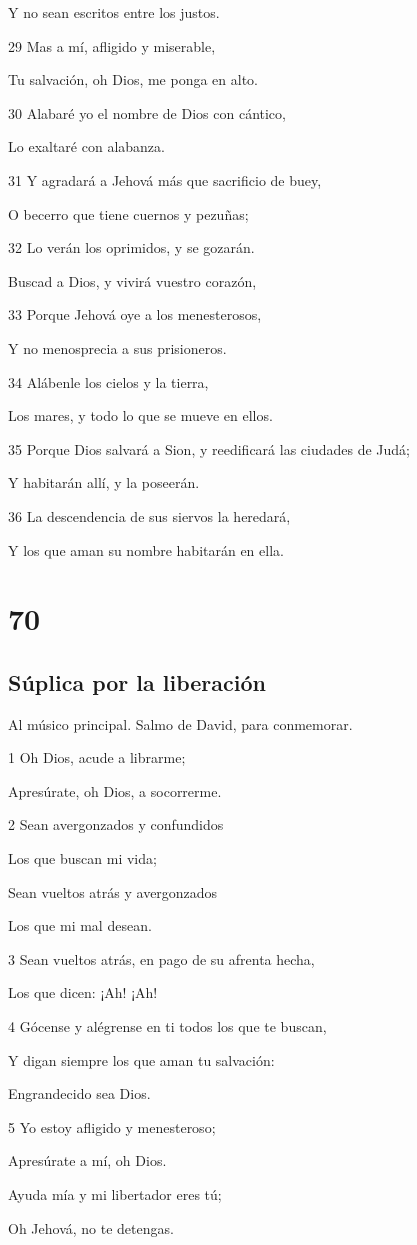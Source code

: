 \par Y no sean escritos entre los justos.
\par 29 Mas a mí, afligido y miserable,
\par Tu salvación, oh Dios, me ponga en alto.
\par 30 Alabaré yo el nombre de Dios con cántico,
\par Lo exaltaré con alabanza.
\par 31 Y agradará a Jehová más que sacrificio de buey,
\par O becerro que tiene cuernos y pezuñas;
\par 32 Lo verán los oprimidos, y se gozarán.
\par Buscad a Dios, y vivirá vuestro corazón,
\par 33 Porque Jehová oye a los menesterosos,
\par Y no menosprecia a sus prisioneros.
\par 34 Alábenle los cielos y la tierra,
\par Los mares, y todo lo que se mueve en ellos.
\par 35 Porque Dios salvará a Sion, y reedificará las ciudades de Judá;
\par Y habitarán allí, y la poseerán.
\par 36 La descendencia de sus siervos la heredará,
\par Y los que aman su nombre habitarán en ella.

\chapter{70}

\section*{Súplica por la liberación}

\par Al músico principal. Salmo de David, para conmemorar.

\par 1 Oh Dios, acude a librarme;
\par Apresúrate, oh Dios, a socorrerme.
\par 2 Sean avergonzados y confundidos
\par Los que buscan mi vida;
\par Sean vueltos atrás y avergonzados
\par Los que mi mal desean.
\par 3 Sean vueltos atrás, en pago de su afrenta hecha,
\par Los que dicen: ¡Ah! ¡Ah!
\par 4 Gócense y alégrense en ti todos los que te buscan,
\par Y digan siempre los que aman tu salvación:
\par Engrandecido sea Dios.
\par 5 Yo estoy afligido y menesteroso;
\par Apresúrate a mí, oh Dios.
\par Ayuda mía y mi libertador eres tú;
\par Oh Jehová, no te detengas.

